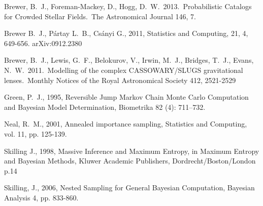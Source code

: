 \documentclass[letterpaper, 11pt]{article}
\begin{document}
\begin{thebibliography}{}

 Brewer, B.~J., 
Foreman-Mackey, D., Hogg, D.~W.\ 2013.\ Probabilistic Catalogs for Crowded 
Stellar Fields.\ The Astronomical Journal 146, 7. 

 Brewer B.~J., P{\'a}rtay L.~B., Cs{\'a}nyi G., 2011,
Statistics and Computing, 21, 4, 649-656. arXiv:0912.2380

 Brewer, B.~J., Lewis,
G.~F., Belokurov, V., Irwin, M.~J., Bridges, T.~J., Evans, N.~W.\ 2011.\
Modelling of the complex CASSOWARY/SLUGS gravitational lenses.\ Monthly
Notices of the Royal Astronomical Society 412, 2521-2529

Green, P.~J., 1995, Reversible Jump Markov Chain Monte Carlo Computation and Bayesian Model Determination, Biometrika 82 (4): 711–732.

 Neal, R.~M., 2001, 
Annealed importance sampling, Statistics and Computing, vol. 11, pp. 125-139.

Skilling J., 1998, Massive Inference and Maximum Entropy, in Maximum Entropy
and Bayesian Methods, Kluwer Academic Publishers, Dordrecht/Boston/London p.14

 Skilling, J., 2006, Nested Sampling for General Bayesian Computation, Bayesian Analysis 4, pp. 833-860.


\end{thebibliography}
\end{document}
